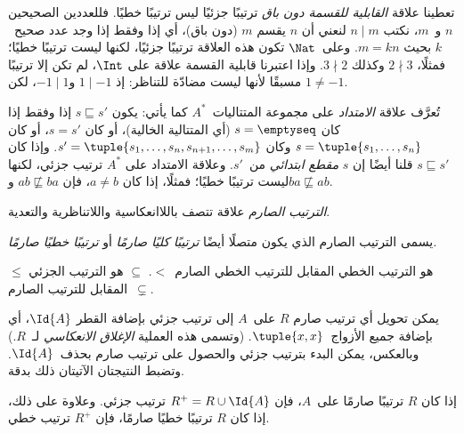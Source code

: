 \documentclass[../../../include/open-logic-section]{subfiles}
\begin{document}
\begin{ex}
تعطينا علاقة \emph{القابلية للقسمة دون باق} ترتيبًا جزئيًا ليس ترتيبًا
خطيًا. فللعددين الصحيحين $n$ و~$m$، نكتب $n \mid m$ لنعني أن $n$ يقسم
$m$ (دون باق)، أي إذا وفقط إذا وجد عدد صحيح~$k$ بحيث $m = kn$. وعلى~$\Nat$
تكون هذه العلاقة ترتيبًا جزئيًا، لكنها ليست ترتيبًا خطيًا؛ فمثلًا،
$2 \nmid 3$ وكذلك $3 \nmid 2$. وإذا اعتبرنا قابلية القسمة علاقة على
$\Int$، لم تكن إلا ترتيبًا مسبقًا لأنها ليست مضادّة للتناظر: إذ
$1 \mid -1$ و$-1 \mid 1$، لكن $1 \neq -1$.
\end{ex}

\begin{ex}
تُعرَّف علاقة \emph{الامتداد} على مجموعة المتتاليات~$A^*$ كما يأتي:
يكون $s \sqsubseteq s'$ إذا وفقط إذا كان $s = \emptyseq$ (أي المتتالية
الخالية)، أو كان $s = s'$، أو كان $s = \tuple{s_1, \dots, s_n}$ وكان
$s' = \tuple{s_1, \dots, s_n, s_{n+1}, \dots, s_m}$. وإذا كان
$s \sqsubseteq s'$ قلنا أيضًا إن $s$ \emph{مقطع ابتدائي} من~$s'$.
وعلاقة الامتداد على $A^*$ ترتيب جزئي، لكنها ليست ترتيبًا خطيًا؛ فمثلًا،
إذا كان $a \neq b$، فإن $ab \not\sqsubseteq ba$ و$ba \not\sqsubseteq ab$.
\end{ex}

\begin{defn}
\emph{الترتيب الصارم} علاقة تتصف باللاانعكاسية واللاتناظرية والتعدية.
\end{defn}

\begin{defn}
يسمى الترتيب الصارم الذي يكون متصلًا أيضًا
\emph{ترتيبًا كليًا صارمًا} أو \emph{ترتيبًا خطيًا صارمًا.}
\end{defn}

\begin{ex}
$\le$ هو الترتيب الخطي المقابل للترتيب الخطي الصارم~$<$.
$\subseteq$ هو الترتيب الجزئي المقابل للترتيب الصارم~$\subsetneq$.
\end{ex}

يمكن تحويل أي ترتيب صارم $R$ على~$A$ إلى ترتيب جزئي بإضافة القطر
$\Id{A}$، أي بإضافة جميع الأزواج~$\tuple{x, x}$. (وتسمى هذه العملية
\emph{الإغلاق الانعكاسي} لـ~$R$.) وبالعكس، يمكن البدء بترتيب جزئي والحصول
على ترتيب صارم بحذف~$\Id{A}$. وتضبط النتيجتان الآتيتان ذلك بدقة.

\begin{prop}
إذا كان $R$ ترتيبًا صارمًا على~$A$، فإن $R^+ = R \cup \Id{A}$ ترتيب
جزئي. وعلاوة على ذلك، إذا كان $R$ ترتيبًا خطيًا صارمًا، فإن $R^+$ ترتيب
خطي.
\end{prop}
\end{document}
